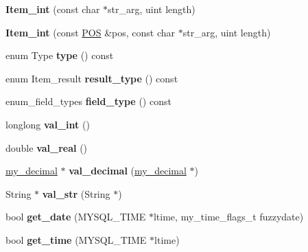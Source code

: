 \begin{DoxyCompactItemize}
{\bfseries Item\+\_\+int} (const char $\ast$str\+\_\+arg, uint length)
\item 
\mbox{\label{classItem__int_a734fb65c2cdbc15f77098ce1087edfc5}} 
{\bfseries Item\+\_\+int} (const \mbox{\hyperlink{structYYLTYPE}{P\+OS}} \&pos, const char $\ast$str\+\_\+arg, uint length)
\item 
\mbox{\label{classItem__int_abb2675244ab83c64548f034b05937bc8}} 
enum Type {\bfseries type} () const
\item 
\mbox{\label{classItem__int_ada1b86d973a65002dc2880c0b61b7d69}} 
enum Item\+\_\+result {\bfseries result\+\_\+type} () const
\item 
\mbox{\label{classItem__int_a8d5b6705bb005f116e10fbbb84c3f8f8}} 
enum\+\_\+field\+\_\+types {\bfseries field\+\_\+type} () const
\item 
\mbox{\label{classItem__int_a74f33a3e6696a2fdfbeeaa42e2cc9525}} 
longlong {\bfseries val\+\_\+int} ()
\item 
\mbox{\label{classItem__int_a915933b8b6cce5cb00c09e0e06c588ce}} 
double {\bfseries val\+\_\+real} ()
\item 
\mbox{\label{classItem__int_af8667900a1f9944ce244e23b0993881f}} 
\mbox{\hyperlink{classmy__decimal}{my\+\_\+decimal}} $\ast$ {\bfseries val\+\_\+decimal} (\mbox{\hyperlink{classmy__decimal}{my\+\_\+decimal}} $\ast$)
\item 
\mbox{\label{classItem__int_a255a3bd292cfe0cff2273224f466b42a}} 
String $\ast$ {\bfseries val\+\_\+str} (String $\ast$)
\item 
\mbox{\label{classItem__int_af5a60db9750358b578f0187a9a933014}} 
bool {\bfseries get\+\_\+date} (M\+Y\+S\+Q\+L\+\_\+\+T\+I\+ME $\ast$ltime, my\+\_\+time\+\_\+flags\+\_\+t fuzzydate)
\item 
\mbox{\label{classItem__int_a5c52bda3b614a6fe4b4d5f1a518dd06c}} 
bool {\bfseries get\+\_\+time} (M\+Y\+S\+Q\+L\+\_\+\+T\+I\+ME $\ast$ltime)
\item 

\end{DoxyCompactItemize}
